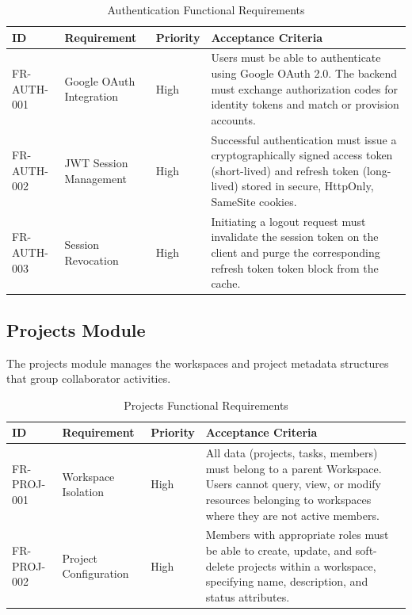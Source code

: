 \begin{table}[h!]
\centering
\small
\renewcommand{\arraystretch}{1.5}
\begin{tabularx}{\textwidth}{l p{2.2cm} l X}
    \toprule[1.5pt]
    \rowcolor{primary!5}
    \textbf{\color{primary}ID} & \textbf{\color{primary}Requirement} & \textbf{\color{primary}Priority} & \textbf{\color{primary}Acceptance Criteria} \\
    \midrule
    FR-AUTH-001 & Google OAuth Integration & High & Users must be able to authenticate using Google OAuth 2.0. The backend must exchange authorization codes for identity tokens and match or provision accounts. \\
    FR-AUTH-002 & JWT Session Management & High & Successful authentication must issue a cryptographically signed access token (short-lived) and refresh token (long-lived) stored in secure, HttpOnly, SameSite cookies. \\
    FR-AUTH-003 & Session Revocation & High & Initiating a logout request must invalidate the session token on the client and purge the corresponding refresh token token block from the cache. \\
    \bottomrule[1.5pt]
\end{tabularx}
\caption{Authentication Functional Requirements}
\label{tab:fr_auth}
\end{table}

\subsection{Projects Module}
The projects module manages the workspaces and project metadata structures that group collaborator activities.

\begin{table}[h!]
\centering
\small
\renewcommand{\arraystretch}{1.5}
\begin{tabularx}{\textwidth}{l p{2.2cm} l X}
    \toprule[1.5pt]
    \rowcolor{primary!5}
    \textbf{\color{primary}ID} & \textbf{\color{primary}Requirement} & \textbf{\color{primary}Priority} & \textbf{\color{primary}Acceptance Criteria} \\
    \midrule
    FR-PROJ-001 & Workspace Isolation & High & All data (projects, tasks, members) must belong to a parent Workspace. Users cannot query, view, or modify resources belonging to workspaces where they are not active members. \\
    FR-PROJ-002 & Project Configuration & High & Members with appropriate roles must be able to create, update, and soft-delete projects within a workspace, specifying name, description, and status attributes. \\
    \bottomrule[1.5pt]
\end{tabularx}
\caption{Projects Functional Requirements}
\label{tab:fr_proj}
\end{table}

